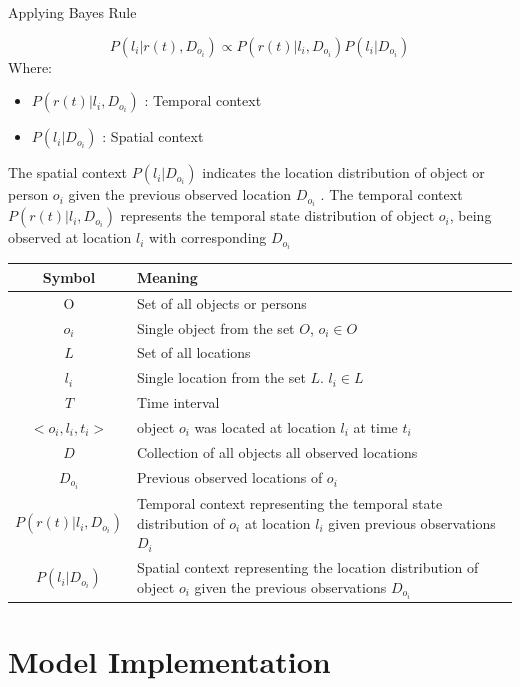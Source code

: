     Applying Bayes Rule
    
    \begin{equation}\label{eq:3}
	P( l_i | r(t), D_{o_i}) \propto P(r(t) | l_i, D_{o_i})  P(l_i | D_{o_i})
    \end{equation}
    Where:
    \begin{itemize}[label=]
    \item $P(r(t) | l_i, D_{o_i})$ : Temporal context 
    \item $P(l_i | D_{o_i})$ : Spatial context
    \end{itemize}
    
     The spatial context $P(l_i | D_{o_i})$ indicates the location distribution of object or person $o_i$ given the previous observed location $D_{o_i}$ . The temporal context $P(r(t) | l_i, D_{o_i})$ represents the temporal state distribution of object $o_i$, being observed at location $l_i$ with corresponding $D_{o_i}$
    


\begin{tabular}{cp{8cm}}
    \hline
	Symbol & Meaning\\
	\hline
	O & Set of all objects or persons\\
	$o_i$ & Single object from the set $O$, $o_i \in O$ \\
	$L$ & Set of all locations\\
	$l_i$ & Single location from the set $L$. $l_i\in L$\\
    $T$ & Time interval\\
    \hline
	$<o_i,l_i,t_i>$ & object $o_i$ was located at location $l_i$ at time $t_i$\\
	$D$ & Collection of all objects all observed locations\\
	$D_{o_i}$ & Previous observed locations of $o_i$\\ 
    \hline
     $P(r(t) | l_i, D_{o_i})$ &  Temporal context representing the temporal state distribution of $o_i$ at location $l_i$ given previous observations $D_i$\\
     $P(l_i | D_{o_i})$ & Spatial context representing the location distribution of object $o_i$ given the previous observations $D_{o_i}$\\
    \hline
\end{tabular}

\section{Model Implementation}

